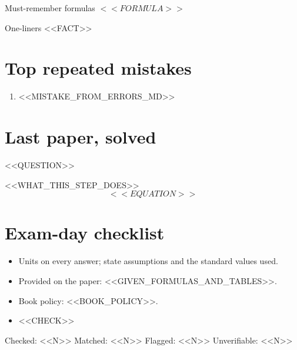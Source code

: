 \documentclass[11pt]{article}
\begin{document}
\begin{tmonepage}[3]{Must-remember formulas}
$<<FORMULA>>$\\
\end{tmonepage}
\newpage
\begin{tmonepage}[3]{One-liners}
\tmpt <<FACT>>
\end{tmonepage}
\newpage
\section*{Top repeated mistakes}
\begin{enumerate}
  \item <<MISTAKE_FROM_ERRORS_MD>>
\end{enumerate}
\section*{Last paper, solved}
\begin{tmexample}
<<QUESTION>>
\begin{tmsolution}
  \item <<WHAT_THIS_STEP_DOES>>
  \[ <<EQUATION>> \]
\end{tmsolution}
\end{tmexample}
\section*{Exam-day checklist}
\begin{itemize}
  \item Units on every answer; state assumptions and the standard values used.
  \item Provided on the paper: <<GIVEN_FORMULAS_AND_TABLES>>.
  \item Book policy: <<BOOK_POLICY>>.
  \item <<CHECK>>
\end{itemize}
\begin{tmverify}
Checked: <<N>> \quad Matched: <<N>> \quad Flagged: <<N>> \quad Unverifiable: <<N>>
\end{tmverify}
\end{document}
